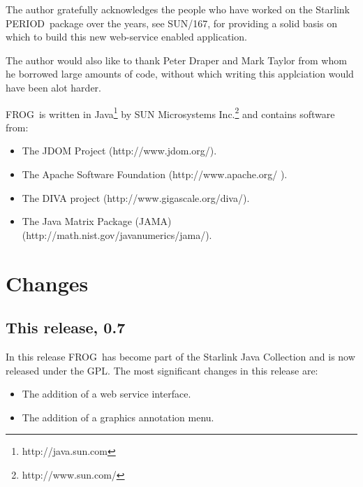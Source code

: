 \documentclass[twoside,11pt]{article}
\newcommand{\htmladdnormallinkfoot}[2]{#1\footnote{#2}}
\newcommand{\htmladdnormallink}[2]{#1}
\newcommand{\xref}[3]{#1}
\newcommand{\xlabel}[1]{}
\renewcommand{\_}{\texttt{\symbol{95}}}
\newcommand{\FROG}{\textsf{FROG}}
\newcommand{\PERIOD}{\textsf{PERIOD}}
\begin{document}
The author gratefully acknowledges the people who have worked on the Starlink \PERIOD\ package over the years, see \xref{SUN/167}{sun167}{}, for providing a solid basis on which to build this new web-service enabled application.

The author would also like to thank Peter Draper and Mark Taylor from whom he borrowed large amounts of code, without which writing this applciation would have been alot harder.

\FROG\ is written in
\htmladdnormallinkfoot{Java}{http://java.sun.com} by
\htmladdnormallinkfoot{SUN Microsystems Inc.}{http://www.sun.com/} and
contains software from:
\begin{itemize}
\item The JDOM Project (\htmladdnormallink{http://www.jdom.org/}
                        {http://www.jdom.org/}).
\item The Apache Software Foundation
      (\htmladdnormallink{http://www.apache.org/}{http://www.apache.org/} ).
\item The DIVA project
      (\htmladdnormallink{http://www.gigascale.org/diva/}
                         {http://www.gigascale.org/diva/}).
\item The Java Matrix Package (JAMA)
      (\htmladdnormallink{http://math.nist.gov/javanumerics/jama/}
                         {http://math.nist.gov/javanumerics/jama/}).
\end{itemize}

\section{Changes\xlabel{changes}}
\subsection{This release, 0.7}
In this release \FROG\ has become part of the Starlink Java Collection and is now released under the GPL. The most significant changes in this release are:
\begin{itemize}

   \item The addition of a web service interface.
   
   \item The addition of a graphics annotation menu.
    
\end{itemize}

\end{document}

